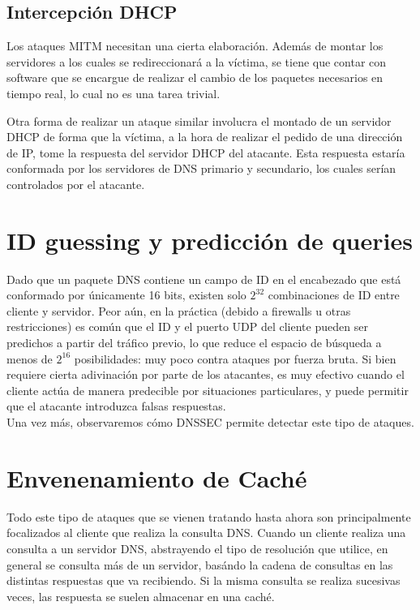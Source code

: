 \subsection{Intercepci\'on DHCP}

Los ataques MITM necesitan una cierta elaboraci\'on. Adem\'as de montar los
servidores a los cuales se redireccionar\'a a la v\'ictima, se tiene que contar
con software que se encargue de realizar el cambio de los paquetes necesarios en
tiempo real, lo cual no es una tarea trivial. 

Otra forma de realizar un ataque similar involucra el montado de un servidor
DHCP de forma que la v\'ictima, a la hora de realizar el pedido de una
direcci\'on de IP, tome la respuesta del servidor DHCP del atacante. Esta
respuesta estar\'ia conformada por los servidores de DNS primario y secundario,
los cuales ser\'ian controlados por el atacante.

\section{ID guessing y predicci\'on de queries}

Dado que un paquete DNS contiene un campo de ID en el encabezado que est\'a conformado por \'unicamente 16 bits, existen solo $2^{32}$ combinaciones de ID entre cliente y servidor. Peor a\'un, en la pr\'actica (debido a firewalls u otras restricciones) es com\'un que el ID y el puerto UDP del cliente pueden ser predichos a partir del tr\'afico previo, lo que reduce el espacio de b\'usqueda a menos de $2^{16}$ posibilidades: muy poco contra ataques por fuerza bruta. Si bien requiere cierta adivinaci\'on por parte de los atacantes, es muy efectivo cuando el cliente act\'ua de manera predecible por situaciones particulares, y puede permitir que el atacante introduzca falsas respuestas.\\
Una vez m\'as, observaremos c\'omo DNSSEC permite detectar este tipo de ataques.

\section{Envenenamiento de Cach\'e}

Todo este tipo de ataques que se vienen tratando hasta ahora son principalmente
focalizados al cliente que realiza la consulta DNS. Cuando un cliente realiza
una consulta a un servidor DNS, abstrayendo el tipo de resoluci\'on que utilice,
en general se consulta m\'as de un servidor, bas\'ando la cadena de consultas en
las distintas respuestas que va recibiendo. Si la misma consulta se realiza
sucesivas veces, las respuesta se suelen almacenar en una cach\'e.

